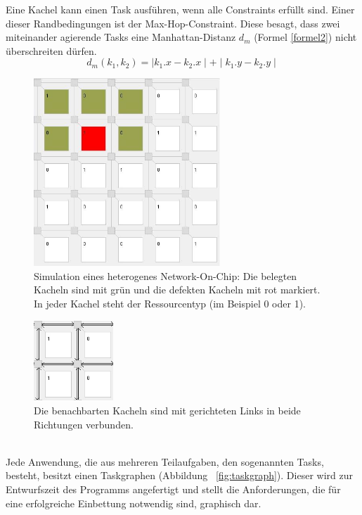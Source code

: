 Eine Kachel kann einen Task ausführen, wenn alle Constraints erfüllt sind. Einer dieser Randbedingungen ist der Max-Hop-Constraint. Diese besagt, dass zwei miteinander agierende Tasks eine Manhattan-Distanz  $d_m$ (Formel \ref{formel2}) nicht überschreiten dürfen. 
\begin{equation}
d_m (k_1,k_2) = \mid k_1.x - k_2.x \mid + \mid k_1.y - k_2.y \mid 
\label{formel2}
\end{equation}

\begin{figure}[H]\centering
\includegraphics[width = 70mm]{bilder/NoC.jpg}
\caption{Simulation eines heterogenes Network-On-Chip: Die belegten Kacheln sind mit grün und die defekten Kacheln mit rot markiert. In jeder Kachel steht der Ressourcentyp (im Beispiel 0 oder 1).}\label{fig:nocbild}
\end{figure}

\begin{figure}[H]\centering
  \includegraphics[width = 30mm]{bilder/Links.jpg}
  \caption{Die benachbarten Kacheln sind mit gerichteten Links in beide Richtungen verbunden.}\label{fig:links}
\end{figure}
\ \\
Jede Anwendung, die aus mehreren Teilaufgaben, den sogenannten Tasks, besteht, besitzt einen Taskgraphen (Abbildung ~\ref{fig:taskgraph}). Dieser wird zur Entwurfszeit des Programms angefertigt und stellt die Anforderungen, die für eine erfolgreiche Einbettung notwendig sind, graphisch dar.

